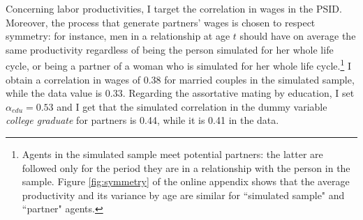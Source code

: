 \documentclass[12pt]{article}
\begin{document}
\begin{table}[h!]
 \end{table}
  Concerning labor productivities, I target the correlation in wages in the PSID. Moreover, the process that generate partners' wages is chosen to respect symmetry: for instance, men in a relationship at age $t$ should have on average the same productivity regardless of being the person simulated for her whole life cycle, or being a partner of a woman who is simulated for her whole life cycle.\footnote{Agents in the simulated sample meet potential partners: the latter are followed only for the period they are in a relationship with the person in the sample. Figure \ref{fig:symmetry} of the online appendix shows that the average productivity and its variance by age are similar for ``simulated sample" and ``partner" agents.} I obtain a correlation in wages of 0.38 for married couples in the simulated sample, while the data value is 0.33. Regarding the assortative mating by education, I set $\alpha_{edu}=0.53$ and I get that the simulated correlation in the dummy variable \textit{college graduate} for partners is 0.44, while it is 0.41 in the data.
\end{document}
